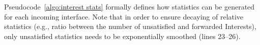 \documentclass[10pt,conference]{IEEEtran}
\begin{document}


Pseudocode~\ref{algo:interest stats} formally defines how statistics can be generated for  each incoming interface. Note that in order to ensure decaying of relative statistics (e.g., ratio between the number of unsatisfied and forwarded Interests), only unsatisfied statistics needs to be exponentially smoothed (lines 23--26).  


\end{document}
